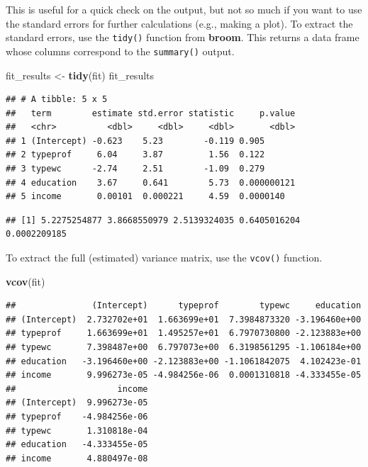 \documentclass[12pt,oneside,openany]{book}
\newenvironment{Shaded}{\begin{snugshade}}{\end{snugshade}}
\newcommand{\KeywordTok}[1]{\textcolor[rgb]{0.13,0.29,0.53}{\textbf{#1}}}
\newcommand{\StringTok}[1]{\textcolor[rgb]{0.31,0.60,0.02}{#1}}
\newcommand{\OperatorTok}[1]{\textcolor[rgb]{0.81,0.36,0.00}{\textbf{#1}}}
\newcommand{\NormalTok}[1]{#1}
\begin{document}
This is useful for a quick check on the output, but not so much if you
want to use the standard errors for further calculations (e.g., making a
plot). To extract the standard errors, use the \texttt{tidy()} function
from \textbf{broom}. This returns a data frame whose columns correspond
to the \texttt{summary()} output.

\begin{Shaded}
\begin{Highlighting}[]
\NormalTok{fit_results <-}\StringTok{ }\KeywordTok{tidy}\NormalTok{(fit)}
\NormalTok{fit_results}
\end{Highlighting}
\end{Shaded}

\begin{verbatim}
## # A tibble: 5 x 5
##   term        estimate std.error statistic     p.value
##   <chr>          <dbl>     <dbl>     <dbl>       <dbl>
## 1 (Intercept) -0.623    5.23        -0.119 0.905      
## 2 typeprof     6.04     3.87         1.56  0.122      
## 3 typewc      -2.74     2.51        -1.09  0.279      
## 4 education    3.67     0.641        5.73  0.000000121
## 5 income       0.00101  0.000221     4.59  0.0000140
\end{verbatim}

\begin{Shaded}
\end{Shaded}

\begin{verbatim}
## [1] 5.2275254877 3.8668550979 2.5139324035 0.6405016204 0.0002209185
\end{verbatim}

To extract the full (estimated) variance matrix, use the \texttt{vcov()}
function.

\begin{Shaded}
\begin{Highlighting}[]
\KeywordTok{vcov}\NormalTok{(fit)}
\end{Highlighting}
\end{Shaded}

\begin{verbatim}
##               (Intercept)      typeprof        typewc     education
## (Intercept)  2.732702e+01  1.663699e+01  7.3984873320 -3.196460e+00
## typeprof     1.663699e+01  1.495257e+01  6.7970730800 -2.123883e+00
## typewc       7.398487e+00  6.797073e+00  6.3198561295 -1.106184e+00
## education   -3.196460e+00 -2.123883e+00 -1.1061842075  4.102423e-01
## income       9.996273e-05 -4.984256e-06  0.0001310818 -4.333455e-05
##                    income
## (Intercept)  9.996273e-05
## typeprof    -4.984256e-06
## typewc       1.310818e-04
## education   -4.333455e-05
## income       4.880497e-08
\end{verbatim}
\end{document}
